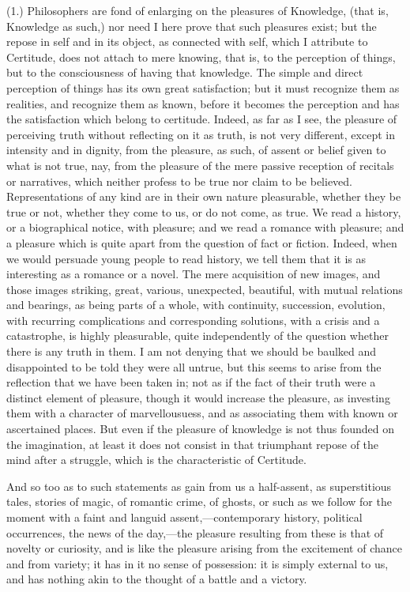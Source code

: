 (1.) Philosophers are fond of enlarging on the pleasures of
Knowledge, (that is, Knowledge as such,) nor need I here prove that
such pleasures exist; but the repose in self and in its object, as
connected with self, which I attribute to Certitude, does not attach
to mere knowing, that is, to the perception of things, but to the
consciousness of having that knowledge. The simple and direct
perception of things has its own great satisfaction; but it must
recognize them as realities, and recognize them as known, before it
becomes the perception and has the satisfaction which belong to
certitude. Indeed, as far as I see, the pleasure of perceiving truth
without reflecting on it as truth, is not very different, except in
intensity and in dignity, from the pleasure, as such, of assent or
belief given to what is not true, nay, from the pleasure of the mere
passive reception of recitals or narratives, which neither profess to
be true nor claim to be believed. Representations of any kind are in
their own nature pleasurable, whether they be true or not, whether
they come to us, or do not come, as true. We read a history, or a
biographical notice, with pleasure; and we read a romance with
pleasure; and a pleasure which is quite apart from the question of
fact or fiction. Indeed, when we would persuade young people to read
history, we tell them that it is as interesting as a romance or a
novel. The mere acquisition of new images, and those images
striking, great, various, unexpected, beautiful, with mutual relations
and bearings, as being parts of a whole, with continuity, succession,
evolution, with recurring complications and corresponding solutions,
with a crisis and a catastrophe, is highly pleasurable, quite
independently of the question whether there is any truth in them. I am
not denying that we should be baulked and disappointed to be told they
were all untrue, but this seems to arise from the reflection that we
have been taken in; not as if the fact of their truth were a distinct
element of pleasure, though it would increase the pleasure, as
investing them with a character of marvellousuess, and as associating
them with known or ascertained places. But even if the pleasure of
knowledge is not thus founded on the imagination, at least it does not
consist in that triumphant repose of the mind after a struggle, which
is the characteristic of Certitude.

And so too as to such statements as gain from us a half-assent, as
superstitious tales, stories of magic, of romantic crime, of ghosts,
or such as we follow for the moment with a faint and languid assent,—contemporary
history, political occurrences, the news of the day,—the pleasure
resulting from these is that of novelty or curiosity, and is like the
pleasure arising from the excitement of chance and from variety; it
has in it no sense of possession: it is simply external to us, and has
nothing akin to the thought of a battle and a victory.

